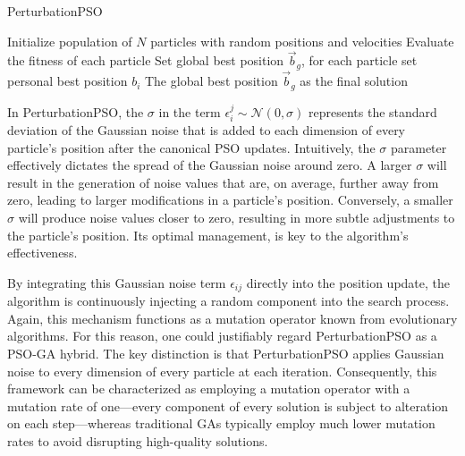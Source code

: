 {\vspace{.635em}
\begin{algorithm}[H]
\caption{PerturbationPSO}\label{alg:perturbation}
Initialize population of \(N\) particles with random positions and velocities\;
Evaluate the fitness of each particle\;
Set global best position \(\vec{b}_g\), for each particle set personal best position \(b_i\)\;
\Return The global best position \(\vec{b}_g\) as the final solution\;
\end{algorithm}
\vspace{.635em}

\enlargethispage{.6\baselineskip}
In PerturbationPSO, the $\sigma$ in the term $\epsilon_{i}^{j} \sim \mathcal{N}(0, \sigma)$ represents the standard deviation of the Gaussian noise that is added to each dimension of every particle's position after the canonical PSO updates. Intuitively, the $\sigma$ parameter effectively dictates the spread of the Gaussian noise around zero. A larger $\sigma$ will result in the generation of noise values that are, on average, further away from zero, leading to larger modifications in a particle's position. Conversely, a smaller $\sigma$ will produce noise values closer to zero, resulting in more subtle adjustments to the particle's position. Its optimal management, is key to the algorithm's effectiveness.

By integrating this Gaussian noise term $\epsilon_{ij}$ directly into the position update, the algorithm is continuously injecting a random component into the search process. Again, this mechanism functions as a mutation operator known from evolutionary algorithms. For this reason, one could justifiably regard PerturbationPSO as a PSO-GA hybrid. The key distinction is that PerturbationPSO applies Gaussian noise to every dimension of every particle at each iteration. Consequently, this framework can be characterized as employing a mutation operator with a mutation rate of one---every component of every solution is subject to alteration on each step---whereas traditional GAs typically employ much lower mutation rates to avoid disrupting high-quality solutions.

}
